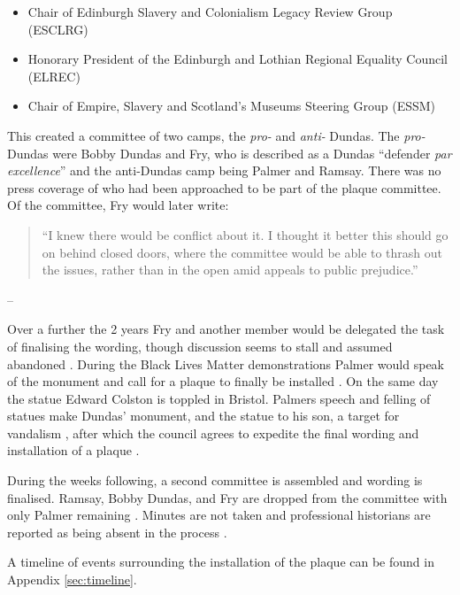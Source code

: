 \documentclass{scrartcl}
\renewcommand{\cite}{\parencite}
\providecommand{\tightlist}{%
  \setlength{\itemsep}{0pt}\setlength{\parskip}{0pt}}
\begin{document}
\begin{itemize}
    \tightlist
    \item Chair of Edinburgh Slavery and Colonialism Legacy Review Group (ESCLRG)
    \item Honorary President of the Edinburgh and Lothian Regional Equality Council (ELREC)  
    \item Chair of Empire, Slavery and Scotland’s Museums Steering Group (ESSM)
\end{itemize}

This created a committee of two camps, the \textit{pro-} and \textit{anti-} Dundas. The \textit{pro-} Dundas were Bobby Dundas and Fry, who is described as a Dundas ``defender \textit{par excellence}'' \cite{mccarthy_2022_1} and the anti-Dundas camp being Palmer and Ramsay. There was no press coverage of who had been approached to be part of the plaque committee. Of the committee, Fry would later write:

\begin{quotation}
``I knew there would be conflict about it. I thought it better this should go on behind closed doors, where the committee would be able to thrash out the issues, rather than in the open amid appeals to public prejudice.''
\end{quotation}
\begin{flushright}
    -- \cite{fry_2020}
\end{flushright}

Over a further the 2 years Fry and another member would be delegated the task of finalising the wording, though discussion seems to stall and assumed abandoned \cite{fry_2020}. During the Black Lives Matter demonstrations Palmer would speak of the monument and call for a plaque to finally be installed \cite{youtube_2020}. On the same day the statue Edward Colston is toppled in Bristol. Palmers speech and felling of statues make Dundas' monument, and the statue to his son, a target for vandalism \cite{hay_2020_3}, after which the council agrees to expedite the final wording and installation of a plaque \cite{council_2020}. 

During the weeks following, a second committee is assembled and wording is finalised. Ramsay, Bobby Dundas, and Fry are dropped from the committee with only Palmer remaining \cite{lloyd_2022}. Minutes are not taken \cite{mccarthy_2022_2} and professional historians are reported as being absent in the process \cite{scotsman_2022}.


A timeline of events surrounding the installation of the plaque can be found in Appendix \ref{sec:timeline}.
\end{document}
